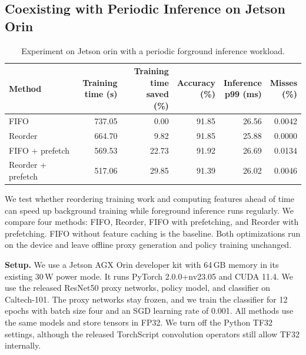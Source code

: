 \begingroup
\color{blue}
\subsection{Coexisting with Periodic Inference on Jetson Orin}
\label{subsec:orin-periodic}

\begin{table}[!t]
\color{blue}
\caption{Experiment on Jetson orin with a periodic forground inference workload.}
\label{tab:orin-prefetch}
\centering
\footnotesize
\setlength{\tabcolsep}{2pt}
\renewcommand{\arraystretch}{1.10}
\begin{tabular}{@{}lrrrrr@{}}
\toprule
Method & \makecell{Training\\time (s)} & \makecell{Training\\time saved\\(\%)} & \makecell{Accuracy\\(\%)} & \makecell{Inference\\p99 (ms)} & \makecell{Misses\\(\%)} \\
\midrule
FIFO & 737.05 & 0.00 & 91.85 & 26.56 & 0.0042 \\
Reorder & 664.70 & 9.82 & 91.85 & 25.88 & 0.0000 \\
FIFO + prefetch & 569.53 & 22.73 & 91.92 & 26.69 & 0.0134 \\
Reorder + prefetch & 517.06 & 29.85 & 91.39 & 26.02 & 0.0046 \\
\bottomrule
\end{tabular}
\end{table}

We test whether reordering training work and computing features ahead of time can speed up background training while foreground inference runs regularly.
We compare four methods: FIFO, Reorder, FIFO with prefetching, and Reorder with prefetching.
FIFO without feature caching is the baseline.
Both optimizations run on the device and leave offline proxy generation and policy training unchanged.

\noindent \textbf{Setup.}
We use a Jetson AGX Orin developer kit with 64\,GB memory in its existing 30\,W power mode.
It runs PyTorch 2.0.0+nv23.05 and CUDA 11.4.
We use the released ResNet50 proxy networks, policy model, and classifier on Caltech-101.
The proxy networks stay frozen, and we train the classifier for 12 epochs with batch size four and an SGD learning rate of 0.001.
All methods use the same models and store tensors in FP32.
We turn off the Python TF32 settings, although the released TorchScript convolution operators still allow TF32 internally.

